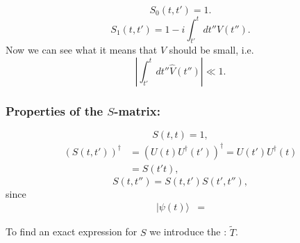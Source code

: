 \[S_{0}(t,t')=1.\]
\[S_{1}(t,t')=1-i\int_{t'}^{t}dt''\hat{V}(t'').\]
Now we can see what it means that $V$ should be small, i.e. \[\left|\int_{t'}^{t}dt''\hat{V}(t'')\right|\ll1.\]
\begin{Indentskip}
	\subsubsection*{Properties of the $S$-matrix:}
	\[S(t,t)=1,\]
	\begin{align}
		\left(S(t,t')\right)^{\dagger}&=\left(U(t)U^{\dagger}(t')\right)^{\dagger} = U(t')U^{\dagger}(t)\nonumber \\
	&=S(t't),\nonumber
	\end{align}
	\[S(t,t'')=S(t,t')S(t',t''),\] since
	\begin{align}
		|\psi(t)\rangle&=    \nonumber
	\end{align}
\end{Indentskip}
To find an exact expression for $S$ we introduce the : $\tilde{T}$.
